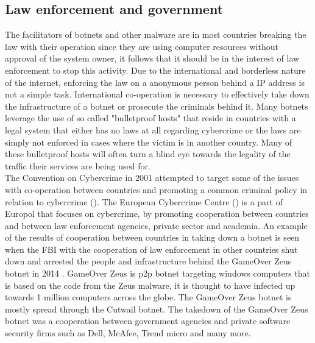 \subsection{Law enforcement and government}
The facilitators of botnets and other malware are in most countries breaking the law with their operation since they are using computer resources without approval of the system owner, it follows that it should be in the interest of law enforcement to stop this activity. 
Due to the international and borderless nature of the internet, enforcing the law on a anonymous person behind a IP address is not a simple task. International co-operation is necessary to effectively take down the infrastructure of a botnet or prosecute the criminals behind it. Many botnets leverage the use of so called "bulletproof hosts" that reside in countries with a legal system that either has no laws at all regarding cybercrime or the laws are simply not enforced in cases where the victim is in another country. Many of these bulletproof hosts will often turn a blind eye towards the legality of the traffic their services are being used for.\\
The Convention on Cybercrime in 2001 attempted to target some of the issues with co-operation between countries and promoting a common criminal policy in relation to cybercrime (\cite{jan-coc}). The European Cybercrime Centre (\cite{jan-ec3}) is a part of Europol that focuses on cybercrime, by promoting cooperation between countries and between law enforcement agencies, private sector and academia.
An example of the results of cooperation between countries in taking down a botnet is seen when the FBI with the cooperation of law enforcement in other countries shut down and arrested the people and infrastructure behind the GameOver Zeus botnet in 2014 \cite{jan-fbi-GOZ, jan-fbi-GOZ2}. GameOver Zeus is p2p botnet targeting windows computers that is based on the code from the Zeus malware, it is thought to have infected up towards 1 million computers across the globe\cite{jan-krebs-goz}. The GameOver Zeus botnet is mostly spread through the Cutwail botnet. The takedown of the GameOver Zeus botnet was a cooperation between government agencies and private software security firms such as Dell, McAfee, Trend micro and many more.


\newpage
